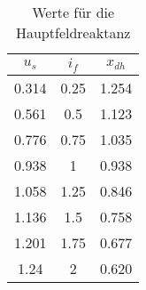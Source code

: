 \begin{table}[!ht]
\centering
\begin{tabular}{|c|c|c|}
\hline
$u_s$    & $i_f$    & $x_{dh}$  \\ \hline
0.314    & 0.25     & 1.254     \\ \hline
0.561    & 0.5      & 1.123     \\ \hline
0.776    & 0.75     & 1.035     \\ \hline
0.938    & 1        & 0.938     \\ \hline
1.058    & 1.25     & 0.846     \\ \hline
1.136    & 1.5      & 0.758     \\ \hline
1.201    & 1.75     & 0.677     \\ \hline
1.24    & 2        & 0.620   \\ \hline
\end{tabular}
\caption{Werte für die Hauptfeldreaktanz}
\label{tab:Hauptfeldreaktanz}

\end{table}


